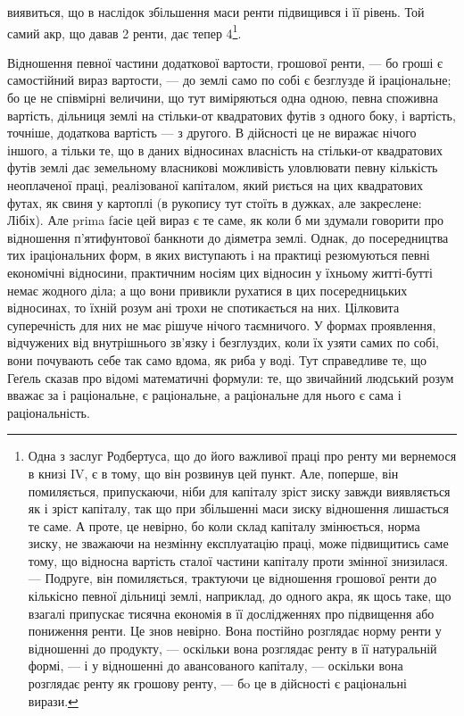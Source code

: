 \parcont{}  %
виявиться, що в наслідок збільшення маси ренти підвищився і її рівень. Той
самий акр, що давав 2 ренти, дає тепер 4\footnote{
Одна з заслуг Родбертуса, що до його важливої праці про ренту ми вернемося в книзі IV,
є в тому, що він розвинув цей пункт. Але, поперше, він помиляється, припускаючи, ніби для капіталу
зріст зиску завжди виявляється як і зріст капіталу, так що при збільшенні маси зиску відношення
лишається
те саме. А проте, це невірно, бо коли склад капіталу змінюється, норма зиску, не зважаючи на
незмінну експлуатацію праці, може підвищитись саме тому, що відносна вартість сталої частини
капіталу
проти змінної знизилася. — Подруге, він помиляється, трактуючи це відношення грошової ренти до
кількісно певної дільниці землі, наприклад, до одного акра, як щось таке, що взагалі припускає
тисячна
економія в її дослідженнях про підвищення або пониження ренти. Це знов невірно. Вона постійно
розглядає норму ренти у відношенні до продукту, — оскільки вона розглядає ренту в її натуральній
формі, — і у відношенні до авансованого капіталу, — оскільки вона розглядає ренту як грошову ренту,
—
бo це в дійсності є раціональні вирази.
}.

Відношення певної частини додаткової вартости, грошової ренти, — бо гроші
є самостійний вираз вартости, — до землі само по собі є безглузде й іраціональне;
бо це не співмірні величини, що тут виміряються одна одною, певна
споживна вартість, дільниця землі на стільки-от квадратових футів з одного
боку, і вартість, точніше, додаткова вартість — з другого. В дійсності це не виражає
нічого іншого, а тільки те, що в даних відносинах власність на стільки-от квадратових
футів землі дає земельному власникові можливість уловлювати певну кількість
неоплаченої праці, реалізованої капіталом, який риється на цих квадратових футах,
як свиня у картоплі (в рукопису тут стоїть в дужках, але закреслене: Лібіх). Але
prima fасiе цей вираз є те саме, як коли б ми здумали говорити про відношення
п’ятифунтової банкноти до діяметра землі. Однак, до посередництва тих іраціональних
форм, в яких виступають і на практиці резюмуються певні економічні
відносини, практичним носіям цих відносин у їхньому житті-бутті немає
жодного діла; а що вони привикли рухатися в цих посередницьких відносинах,
то їхній розум ані трохи не спотикається на них. Цілковита суперечність для них
не має рішуче нічого таємничого. У формах проявлення, відчужених від внутрішнього
зв’язку і безглуздих, коли їх узяти самих по собі, вони почувають себе
так само вдома, як риба у воді. Тут справедливе те, що Геґель сказав про
відомі математичні формули: те, що звичайний людський розум вважає за
і раціональне, є раціональне, а раціональне для нього є сама і раціональність.

